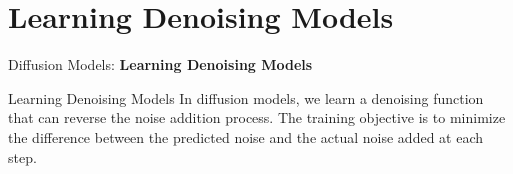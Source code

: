 \section{Learning Denoising Models}
\begin{frame}{}
    \LARGE Diffusion Models: \textbf{Learning Denoising Models}
\end{frame}


\begin{frame}[allowframebreaks]{Learning Denoising Models}
In diffusion models, we learn a denoising function that can reverse the noise addition process. The training objective is to minimize the difference between the predicted noise and the actual noise added at each step.

\end{frame}
